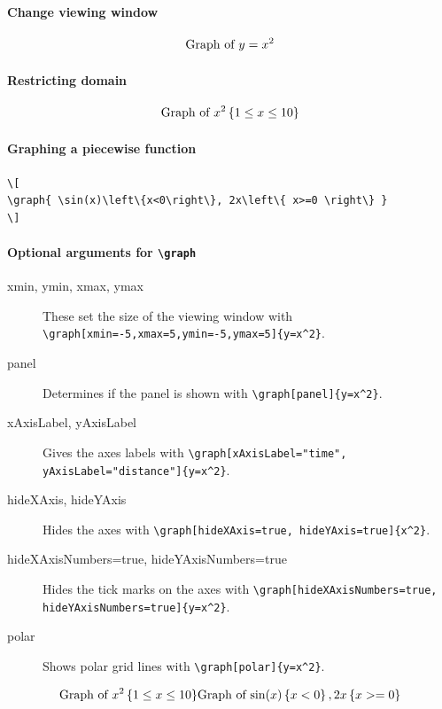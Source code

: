 \documentclass{ximera}
\begin{document}
\paragraph{Change viewing window}
\[
  \graph[xmin=-5,xmax=5,ymin=-5,ymax=5]{y=x^2}
\]

\paragraph{Restricting domain}
\[
  \graph{x^2 \left\{ 1 \leq x \leq 10 \right\} }
\]

\paragraph{Graphing a piecewise function}

\begin{example}
  \begin{verbatim}
\[
\graph{ \sin(x)\left\{x<0\right\}, 2x\left\{ x>=0 \right\} }
\]
\end{verbatim}
\end{example}

\paragraph{Optional arguments for \texttt{\textbackslash graph}}

\begin{description}
  \item[xmin, ymin, xmax, ymax] These set the
    size of the viewing window with
    \verb|\graph[xmin=-5,xmax=5,ymin=-5,ymax=5]{y=x^2}|.
  \item[panel] Determines if the panel is shown with
    \verb|\graph[panel]{y=x^2}|.
  \item[xAxisLabel, yAxisLabel] Gives the axes labels with
    \verb|\graph[xAxisLabel="time", yAxisLabel="distance"]{y=x^2}|.
  \item[hideXAxis, hideYAxis] Hides the axes with
    \verb|\graph[hideXAxis=true, hideYAxis=true]{x^2}|.
  \item[hideXAxisNumbers=true, hideYAxisNumbers=true] Hides the tick marks on
    the axes with
    \verb|\graph[hideXAxisNumbers=true, hideYAxisNumbers=true]{y=x^2}|.
  \item[polar] Shows polar grid lines with \verb|\graph[polar]{y=x^2}|.
\end{description}

\[
  \graph{x^2 \left\{ 1 \leq x \leq 10 \right\}}
  \graph{ \sin(x)\left\{x<0\right\}, 2x\left\{ x>=0 \right\} }
\]
\end{document}
